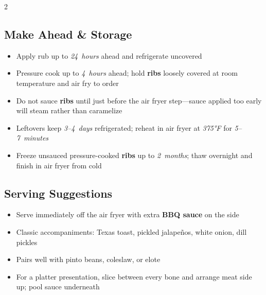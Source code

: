 \documentclass[11pt,letterpaper]{article}
\begin{document}
{\begin{multicols}{2}
\subsection*{Make Ahead \& Storage}
\begin{itemize}
    \item Apply rub up to \textit{24~hours} ahead and refrigerate uncovered
    \item Pressure cook up to \textit{4~hours} ahead; hold \textbf{ribs} loosely covered at room temperature and air fry to order
    \item Do not sauce \textbf{ribs} until just before the air fryer step---sauce applied too early will steam rather than caramelize
    \item Leftovers keep \textit{3--4~days} refrigerated; reheat in air fryer at \textit{375°F} for \textit{5--7~minutes}
    \item Freeze unsauced pressure-cooked \textbf{ribs} up to \textit{2~months}; thaw overnight and finish in air fryer from cold
\end{itemize}

\subsection*{Serving Suggestions}
\begin{itemize}
    \item Serve immediately off the air fryer with extra \textbf{BBQ sauce} on the side
    \item Classic accompaniments: Texas toast, pickled jalape\~nos, white onion, dill pickles
    \item Pairs well with pinto beans, coleslaw, or elote
    \item For a platter presentation, slice between every bone and arrange meat side up; pool sauce underneath
\end{itemize}

\end{multicols}
}
\end{document}
